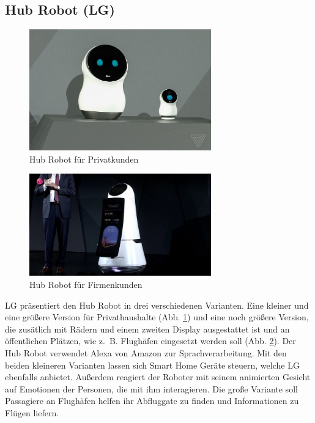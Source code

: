 \subsection{Hub Robot (LG)}
\begin{figure}
  \centering
     \includegraphics[width=0.7\textwidth]{hub_bot_privat}
  \caption{Hub Robot für Privatkunden \cite{AbbildungHubBotPrivat}}
  \label{fig:hub-bot-privat}
\end{figure}
\begin{figure} 
  \centering
     \includegraphics[width=0.7\textwidth]{hub_bot_firmen}
  \caption{Hub Robot für Firmenkunden \cite{AbbildungHubBotFirmen}}
  \label{fig:hub-bot-firma}
\end{figure}
LG präsentiert den Hub Robot in drei verschiedenen Varianten. Eine kleiner und
eine größere Version für Privathaushalte (Abb. \ref{fig:hub-bot-privat})
und eine noch größere Version, die zusätlich mit Rädern und einem zweiten
Display ausgestattet ist und an öffentlichen Plätzen, wie z.~B. Flughäfen
eingesetzt werden soll (Abb. \ref{fig:hub-bot-firma}). Der Hub Robot verwendet
Alexa von Amazon zur Sprachverarbeitung. Mit den beiden kleineren Varianten
lassen sich Smart Home Geräte steuern, welche LG ebenfalls anbietet. Außerdem
reagiert der Roboter mit seinem animierten Gesicht auf Emotionen der Personen,
die mit ihm interagieren. Die große Variante soll Passagiere an Flughäfen helfen
ihr Abfluggate zu finden und Informationen zu Flügen liefern. \cite{Patzschke2018}

